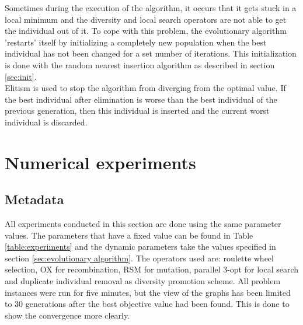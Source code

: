 \documentclass[a4paper,10pt]{article}
\newcommand{\ReplaceMe}[1]{{\color{blue}#1}}
\newcommand{\RemoveMe}[1]{{\color{purple}#1}}
\begin{document}
Sometimes during the execution of the algorithm, it occurs that it gets stuck in a local minimum and the diversity and local search operators are not able to get the individual out of it. To cope with this problem, the evolutionary algorithm 'restarts' itself by initializing a completely new population when the best individual has not been changed for a set number of iterations. This initialization is done with the random nearest insertion algorithm as described in section \ref{sec:init}. \\

Elitism is used to stop the algorithm from diverging from the optimal value. If the best individual after elimination is worse than the best individual of the previous generation, then this individual is inserted and the current worst individual is discarded. 


\section{Numerical experiments}


\subsection{Metadata}



All experiments conducted in this section are done using the same parameter values. The parameters that have a fixed value can be found in Table \ref{table:experiments} and the dynamic parameters take the values specified in section \ref{sec:evolutionary algorithm}. The operators used are: roulette wheel selection, OX for recombination, RSM for mutation, parallel 3-opt for local search and duplicate individual removal as diversity promotion scheme. All problem instances were run for five minutes, but the view of the graphs has been limited to 30 generations after the best objective value had been found. This is done to show the convergence more clearly.\\
\end{document}
